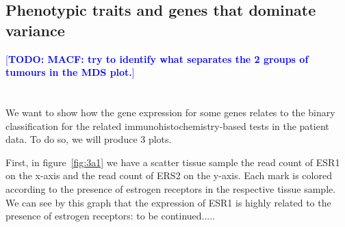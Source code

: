\documentclass[10pt,twocolumn]{article}\usepackage[]{graphicx}\usepackage[]{color}
\newcommand{\todo}[1]{\textcolor{blue}{[\textbf{TODO: #1}]} }
\begin{document}
\subsection{Phenotypic traits and genes that dominate variance} %
  
\todo{MACF: try to identify what separates the 2 groups of tumours in the MDS plot.}
\subsection{} %

\section{} %

\subsection{} %

We want to show how the gene expression for some genes relates to the binary classification for the related immunohistochemistry-based tests in the patient data. To do so, we will produce 3 plots.

First, in figure~\ref{fig:3a1} we have a scatter tissue sample the read count of ESR1 on the x-axis and the read count of ERS2 on the y-axis. Each mark is colored according to the presence of estrogen receptors in the respective tissue sample. We can see by this graph that the expression of ESR1 is highly related to the presence of estrogen receptors: to be continued.....
\end{document}
